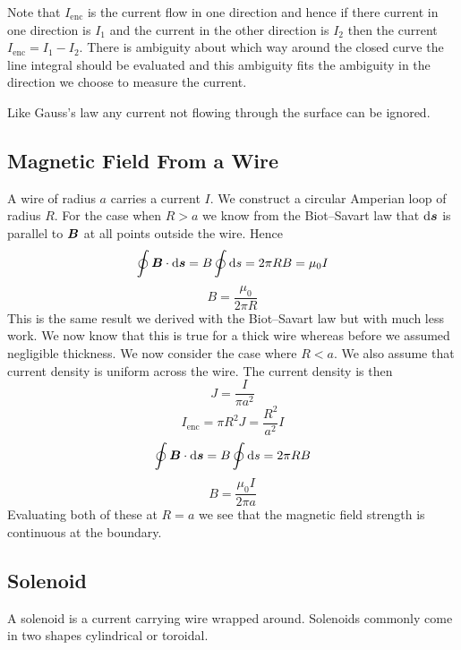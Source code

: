 \documentclass{article}
\begin{document}
    Note that \(I_\text{enc}\) is the current flow in one direction and hence if there current in one direction is \(I_1\) and the current in the other direction is \(I_2\) then the current \(I_\text{enc} = I_1 - I_2\).
    There is ambiguity about which way around the closed curve the line integral should be evaluated and this ambiguity fits the ambiguity in the direction we choose to measure the current.
    
    Like Gauss's law any current not flowing through the surface can be ignored.
    
    \subsection{Magnetic Field From a Wire}
    A wire of radius \(a\) carries a current \(I\).
    We construct a circular Amperian loop of radius \(R\).
    For the case when \(R > a\) we know from the Biot--Savart law that \(\dd\bm{s}\) is parallel to \(\bm{B}\) at all points outside the wire.
    Hence
    \[\oint\bm{B}\cdot\dd\bm{s} = B\oint\dd s = 2\pi RB = \mu_0 I\]
    \[B = \frac{\mu_0 }{2\pi R}\]
    This is the same result we derived with the Biot--Savart law but with much less work.
    We now know that this is true for a thick wire whereas before we assumed negligible thickness.
    We now consider the case where \(R < a\).
    We also assume that current density is uniform across the wire.
    The current density is then
    \[J = \frac{I}{\pi a^2}\]
    \[I_\text{enc} = \pi R^2 J = \frac{R^2}{a^2}I\]
    \[\oint\bm{B}\cdot\dd\bm{s} = B\oint\dd s = 2\pi RB\]
    \[B = \frac{\mu_0 I}{2\pi a}\]
    Evaluating both of these at \(R = a\) we see that the magnetic field strength is continuous at the boundary.
    
    \subsection{Solenoid}
    A solenoid is a current carrying wire wrapped around.
    Solenoids commonly come in two shapes cylindrical or toroidal.
    
\end{document}

